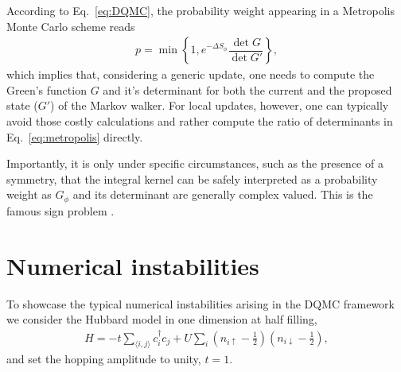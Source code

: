 \documentclass[submission, Phys]{SciPost}
\begin{document}
According to Eq.~\eqref{eq:DQMC}, the probability weight appearing in a Metropolis Monte Carlo scheme reads
\begin{align}
	p = \min \left\{ 1 , e^{-\Delta S_\phi}  \dfrac{\det G}{\det G'} \right\}, \label{eq:metropolis}
\end{align}
which implies that, considering a generic update, one needs to compute the Green's function $G$ and it's determinant for both the current and the proposed state ($G'$) of the Markov walker. For local updates, however, one can typically avoid those costly calculations and rather compute the ratio of determinants in Eq.~\eqref{eq:metropolis} directly.

Importantly, it is only under specific circumstances, such as the presence of a symmetry, that the integral kernel can be safely interpreted as a probability weight as $G_\phi$ and its determinant are generally complex valued. This is the famous sign problem \cite{Li2019}.

\section{Numerical instabilities}\label{sec:instabilities}

To showcase the typical numerical instabilities arising in the DQMC framework we consider the Hubbard model in one dimension at half filling,
\begin{align}
	H = -t\sum_{\langle i,j \rangle} c_i^\dagger c_j + U \sum_i \left( n_{i\uparrow} - \frac{1}{2} \right) \left( n_{i\downarrow} - \frac{1}{2} \right) \label{eq:model},
\end{align}
and set the hopping amplitude to unity, $t=1$.
\end{document}
